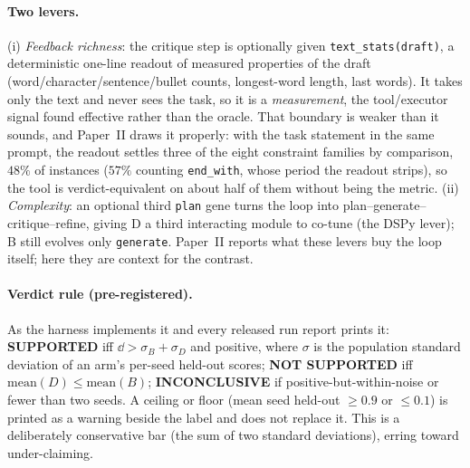 \documentclass[11pt]{article}
\begin{document}
\paragraph{Two levers.}
(i) \emph{Feedback richness}: the critique step is optionally given
\texttt{text\_stats(draft)}, a deterministic one-line readout of measured
properties of the draft (word/character/sentence/bullet counts, longest-word
length, last words). It takes only the text and never sees the task, so it is a
\emph{measurement}, the tool/executor signal \citep{huang2023cannot} found
effective rather than the oracle. That boundary is weaker than it sounds, and Paper~II draws it
properly: with the task statement in the same prompt, the readout settles three of the eight
constraint families by comparison, $48\%$ of instances ($57\%$ counting \texttt{end\_with},
whose period the readout strips), so the tool is verdict-equivalent on about half of them without
being the metric. (ii) \emph{Complexity}: an optional third
\texttt{plan} gene turns the loop into plan--generate--critique--refine, giving
D a third interacting module to co-tune (the DSPy lever); B still evolves only
\texttt{generate}. Paper~II reports what these levers buy the loop itself; here they are
context for the contrast.

\paragraph{Verdict rule (pre-registered).}
As the harness implements it and every released run report prints it:
\textbf{SUPPORTED} iff $\dd > \sigma_B + \sigma_D$ and positive, where $\sigma$ is the
population standard deviation of an arm's per-seed held-out scores;
\textbf{NOT SUPPORTED} iff $\mathrm{mean}(D) \le \mathrm{mean}(B)$;
\textbf{INCONCLUSIVE} if positive-but-within-noise or fewer than two seeds. A ceiling or floor
(mean seed held-out $\ge 0.9$ or $\le 0.1$) is printed as a warning beside the label and does not
replace it. This is a
deliberately conservative bar (the sum of two standard deviations), erring
toward under-claiming.
\end{document}

